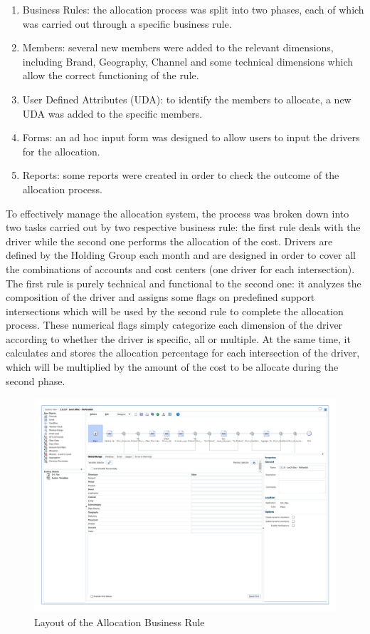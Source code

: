 \documentclass[12pt,a4paper,openright,twoside]{book}
\begin{document}
\begin{enumerate}
    \item Business Rules: the allocation process was split into two phases, each of which was carried out through a specific business rule.
    \item Members: several new members were added to the relevant dimensions, including Brand, Geography, Channel and some technical dimensions which allow the correct functioning of the rule.
    \item User Defined Attributes (UDA): to identify the members to allocate, a new UDA was added to the specific members.
    \item Forms: an ad hoc input form was designed to allow users to input the drivers for the allocation.
    \item Reports: some reports were created in order to check the outcome of the allocation process.
\end{enumerate}

To effectively manage the allocation system, the process was broken down into two tasks carried out by two respective business rule: the first rule deals with the driver while the second one performs the allocation of the cost.
%
Drivers are defined by the Holding Group each month and are designed in order to cover all the combinations of accounts and cost centers (one driver for each intersection).
%
The first rule is purely technical and functional to the second one: it analyzes the composition of the driver and assigns some flags on predefined support intersections which will be used by the second rule to complete the allocation process.
%
These numerical flags simply categorize each dimension of the driver according to whether the driver is specific, all or multiple.
%
At the same time, it calculates and stores the allocation percentage for each intersection of the driver, which will be multiplied by the amount of the cost to be allocate during the second phase.

\begin{figure}[ht]
	\centering
	\includegraphics[width=\linewidth]{figures/rule-allocation.pdf}
	\caption{Layout of the Allocation Business Rule}
	\label{fig:rule-alloc}
\end{figure}
\end{document}
